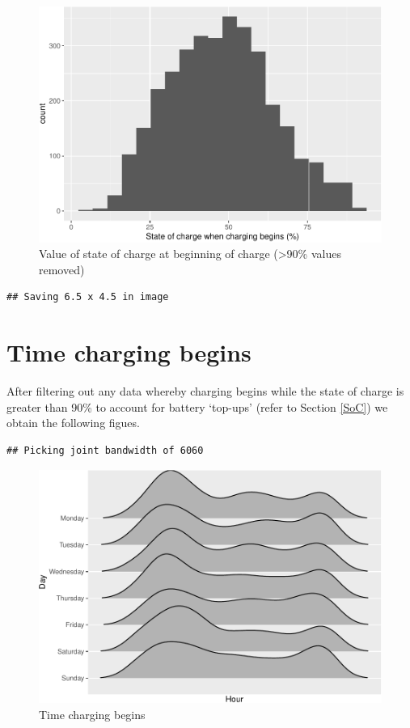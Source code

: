 \documentclass[]{article}
\begin{document}
\begin{figure}
\centering
\includegraphics{EVBB_report_files/figure-latex/SoCplot2-1.pdf}
\caption{\label{fig:SoCplot2}Value of state of charge at beginning of charge
(\textgreater{}90\% values removed)}
\end{figure}

\begin{verbatim}
## Saving 6.5 x 4.5 in image
\end{verbatim}

\section{Time charging begins}\label{time-charging-begins}

After filtering out any data whereby charging begins while the state of
charge is greater than 90\% to account for battery `top-ups' (refer to
Section \ref{SoC}) we obtain the following figues.

\begin{verbatim}
## Picking joint bandwidth of 6060
\end{verbatim}

\begin{figure}
\centering
\includegraphics{EVBB_report_files/figure-latex/ggjoyplotTimeChargingBegins-1.pdf}
\caption{\label{fig:ggjoyplotTimeChargingBegins}Time charging begins}
\end{figure}
\end{document}
